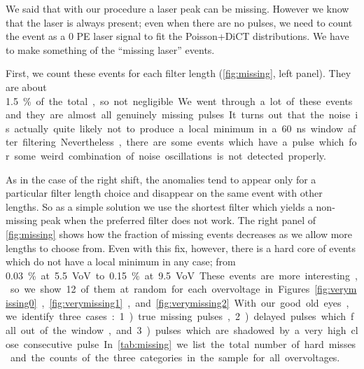 We said that with our procedure a laser peak can be missing. However we know
that the laser is always present; even when there are no pulses, we need to
count the event as a 0 PE laser signal to fit the Poisson+DiCT distributions.
We have to make something of the ``missing laser'' events.

First, we count these events for each filter length (\autoref{fig:missing},
left panel). They are about \SI{1.5}\% of the total, so not negligible. We went
through a lot of these events and they are almost all genuinely missing pulses.
It turns out that the noise is actually quite likely not to produce a local
minimum in a \SI{60}{ns} window after filtering. Nevertheless, there are some
events which have a pulse which for some weird combination of noise
oscillations is not detected properly.

\begin{figure}

    

\end{figure}

As in the case of the right shift, the anomalies tend to appear only for a
particular filter length choice and disappear on the same event with other
lengths. So as a simple solution we use the shortest filter which yields a
non-missing peak when the preferred filter does not work. The right panel of
\autoref{fig:missing} shows how the fraction of missing events decreases as we
allow more lengths to choose from. Even with this fix, however, there is a hard
core of events which do not have a local minimum in any case; from \SI{0.03}\%
at \SI{5.5}{VoV} to \SI{0.15}\% at \SI{9.5}{VoV}.

These events are more interesting, so we show 12 of them at random for each
overvoltage in Figures~\ref{fig:verymissing0}, \ref{fig:verymissing1},
and~\ref{fig:verymissing2}. With our good old eyes, we identify three cases:
1)~true missing pulses, 2)~delayed pulses which fall out of the window, and
3)~pulses which are shadowed by a very high close consecutive pulse. In
\autoref{tab:missing} we list the total number of hard misses and the counts
of the three categories in the sample for all overvoltages.

